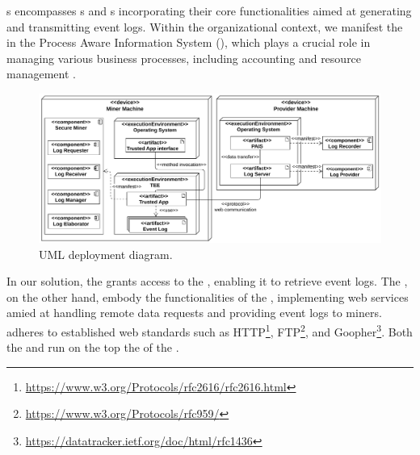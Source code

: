 

s encompasses s and s incorporating their core functionalities aimed at generating and transmitting event logs. Within the organizational context, we manifest the  in the Process Aware Information System (), which plays a crucial role in managing various business processes, including accounting and resource management \cite{Dumas.etal/2018:FundamentalsofBPM}. 
\begin{figure}[t]
	\centering
	\includegraphics[width=1\linewidth]{content/figures/deploymentdiagram3.pdf}
	\caption{UML deployment diagram.}
	\label{fig:deployment_diagram}
\end{figure}
In our solution, the  grants access to the , enabling it to retrieve event logs. The , on the other hand, embody the functionalities of the , implementing web services amied at handling remote data requests and providing event logs to miners.  adheres to established web standards such as HTTP\footnote{\url{https://www.w3.org/Protocols/rfc2616/rfc2616.html}}, FTP\footnote{\url{https://www.w3.org/Protocols/rfc959/}}, and Goopher\footnote{\url{https://datatracker.ietf.org/doc/html/rfc1436}}. Both the  and  run on the top the  of the .




